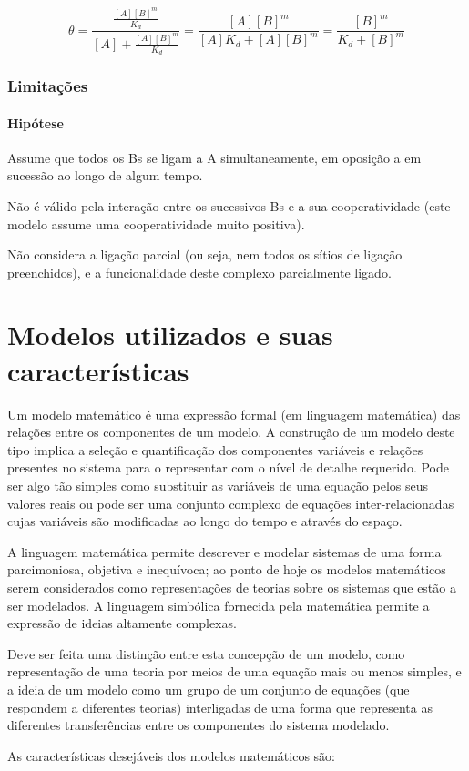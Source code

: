 \documentclass[11pt, letterpaper, portuguese]{article}
\begin{document}
    \begin{equation}
        \theta = \frac{ \frac{[A]{[B]}^m}{K_d} }{ [A] + \frac{[A]{[B]}^m}{K_d} }= \frac{[A]{[B]}^m}{[A] K_d + [A] {[B]}^m} = \frac{{[B]}^m}{ K_d + {[B]}^m}
    \end{equation}
    
    \subsubsection{Limitações}
    
    \paragraph{Hipótese}
    
    \par{Assume que todos os Bs se ligam a A simultaneamente, em oposição a em sucessão ao longo de algum tempo.}
    
    \par{Não é válido pela interação entre os sucessivos Bs e a sua cooperatividade (este modelo assume uma cooperatividade muito positiva).}
    
    \par{Não considera a ligação parcial (ou seja, nem todos os sítios de ligação preenchidos), e a funcionalidade deste complexo parcialmente ligado.
}
    
    
\newpage
\section{Modelos utilizados e suas características} 
\par{Um modelo matemático é uma expressão formal (em linguagem matemática) das relações entre os componentes de um modelo. A construção de um modelo deste tipo implica a seleção e quantificação dos componentes variáveis e relações presentes no sistema para o representar com o nível de detalhe requerido. Pode ser algo tão simples como substituir as variáveis de uma equação pelos seus valores reais ou pode ser uma
conjunto complexo de equações inter-relacionadas cujas variáveis são modificadas ao longo do tempo e através do espaço.
 \cite{Modelos}}
\par{A linguagem matemática permite descrever e modelar sistemas de uma forma parcimoniosa, objetiva e inequívoca; ao ponto de hoje os modelos matemáticos serem considerados como representações de teorias sobre os sistemas que estão a ser modelados. A linguagem simbólica fornecida pela matemática permite a expressão de ideias altamente complexas.} \cite{Modelos}
\par{Deve ser feita uma distinção entre esta concepção de um modelo, como representação de uma teoria por meios de uma equação mais ou menos simples, e a ideia de um modelo como um grupo de um conjunto de equações (que respondem a diferentes teorias) interligadas de uma forma que representa as diferentes transferências entre os componentes do sistema modelado. \cite{Modelos}}
\par{As características desejáveis dos modelos matemáticos são:}
\end{document}
